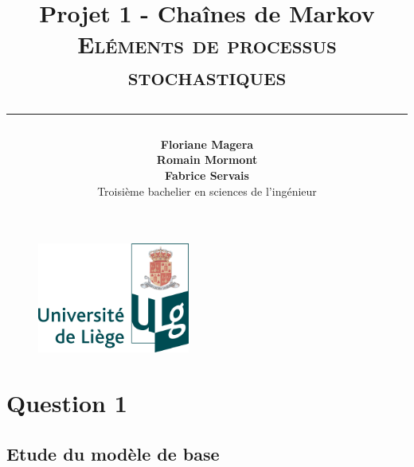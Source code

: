 \documentclass[a4paper,titlepage]{report}
\begin{document}
\begin{titlepage}

\begin{figure}
\centering
\includegraphics[width=5cm]{logo-ulg.png}
\end{figure}



\title{
\vspace{0.2cm}
\LARGE{\textbf{Projet 1 - Chaînes de Markov}} \\ \textsc{Eléments de processus stochastiques}
\author{\textbf{Floriane Magera} \\ \textbf{Romain Mormont} \\ \textbf{Fabrice Servais}\\ Troisième bachelier en sciences de l'ingénieur}
\date{}
\rule{15cm}{1.5pt}
}

\end{titlepage}

\pagestyle{fancy}

\maketitle
\newpage
\tableofcontents
\newpage
\chapter{Question 1}
\section{Etude du modèle de base}
\end{document}
